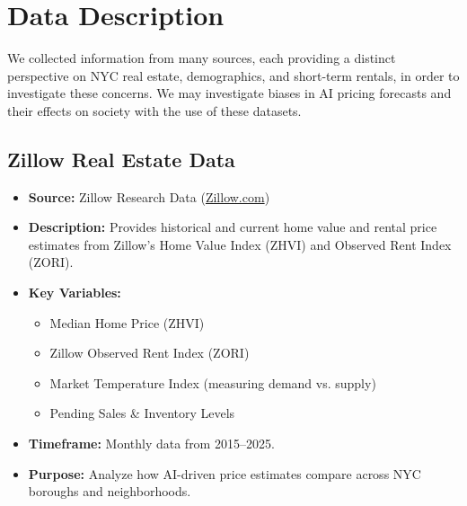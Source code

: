 \documentclass{article}
\begin{document}
\section{Data Description}
We collected information from many sources, each providing a distinct perspective on NYC real estate, demographics, and short-term rentals, in order to investigate these concerns. We may investigate biases in AI pricing forecasts and their effects on society with the use of these datasets. 

\subsection{Zillow Real Estate Data}
\begin{itemize}
    \item \textbf{Source:} Zillow Research Data (\href{https://www.zillow.com/research/data/}{Zillow.com})
    \item \textbf{Description:} Provides historical and current home value and rental price estimates from Zillow’s Home Value Index (ZHVI) and Observed Rent Index (ZORI).
    \item \textbf{Key Variables:}
    \begin{itemize}
        \item Median Home Price (ZHVI)
        \item Zillow Observed Rent Index (ZORI)
        \item Market Temperature Index (measuring demand vs. supply)
        \item Pending Sales \& Inventory Levels
    \end{itemize}
    \item \textbf{Timeframe:} Monthly data from 2015–2025.
    \item \textbf{Purpose:} Analyze how AI-driven price estimates compare across NYC boroughs and neighborhoods.
\end{itemize}
\end{document}
